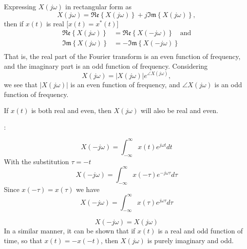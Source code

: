 \begin{frame}
    Expressing $X(j\omega)$ in rectangular form as
    \begin{equation*}
        X(j\omega) 
        = \mathfrak{Re}\left\{X(j\omega)\right\} + j\mathfrak{Im}\left\{X(j\omega)\right\},
    \end{equation*}
    then if $x(t)$ is real [$x(t) = x^\ast(t)$]
    \begin{align*}
        \mathfrak{Re}\left\{X(j\omega)\right\} &= \mathfrak{Re}\left\{X(-j\omega)\right\}\quad \text{and}\\
        \mathfrak{Im}\left\{X(j\omega)\right\} &= -\mathfrak{Im}\left\{X(-j\omega)\right\}\\
    \end{align*}
That is, the real part of the Fourier transform is an even function of frequency, and the imaginary part is an odd function of frequency.
\pause
Considering
    \begin{equation*}
        X(j\omega) = |X(j\omega)|e^{\angle X(j\omega)},
    \end{equation*}
    we see that $|X(j\omega)|$ is an even function of frequency, and $\angle X(j\omega)$ is an odd function of frequency.


\end{frame}

\begin{frame}
    If $x(t)$ is both real and even, then $X(j\omega)$ will also be real and even.\par
    :\par
{}
{
    \begin{equation*}
        X(-j\omega) = \int_{-\infty}^{\infty} x(t)e^{j\omega t}dt
    \end{equation*}
    \pause
    With the substitution $\tau = -t$
    \begin{equation*}
        X(-j\omega) = \int_{-\infty}^{\infty} x(-\tau)e^{-j\omega \tau}d\tau
    \end{equation*}    
    Since $x(-\tau) = x(\tau)$ we have
    \begin{equation*}
        X(-j\omega) = \int_{-\infty}^{\infty} x(\tau)e^{j\omega \tau}d\tau
    \end{equation*} 
       
    \begin{equation*}
        X(-j\omega) = X(j\omega)
    \end{equation*}  
    In a similar manner, it can be shown that if $x(t)$ is a real and odd function of time, so that $x(t) = - x(- t)$, then $X(j\omega)$ is purely imaginary and odd.

}
\end{frame}


